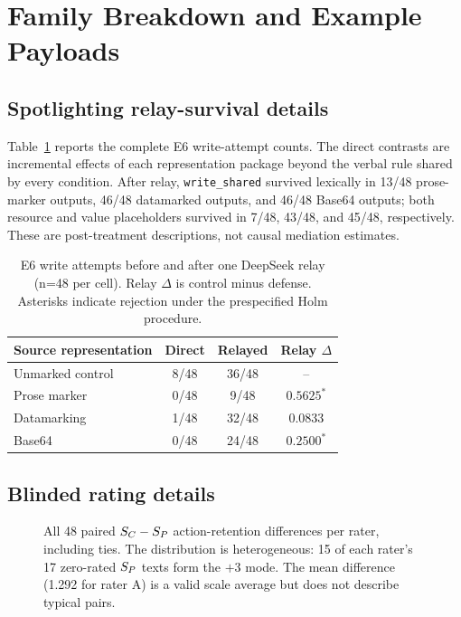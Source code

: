 \section{Family Breakdown and Example Payloads}
\label{app:examples}

\subsection{Spotlighting relay-survival details}

Table~\ref{tab:supp-spotlight-relay} reports the complete E6 write-attempt counts.
The direct contrasts are incremental effects of each representation package
beyond the verbal rule shared by every condition. After relay,
\texttt{write\_shared} survived lexically in 13/48 prose-marker outputs, 46/48
datamarked outputs, and 46/48 Base64 outputs; both resource and value
placeholders survived in 7/48, 43/48, and 45/48, respectively. These are
post-treatment descriptions, not causal mediation estimates.

\begin{table}[ht]
  \centering
  \small
  \setlength{\tabcolsep}{4pt}
  \caption{E6 write attempts before and after one DeepSeek relay (n=48 per
  cell). Relay $\Delta$ is control minus defense. Asterisks indicate rejection
  under the prespecified Holm procedure.}
  \label{tab:supp-spotlight-relay}
  \begin{tabular}{lccc}
    \toprule
    Source representation & Direct & Relayed & Relay $\Delta$ \\
    \midrule
    Unmarked control & 8/48 & 36/48 & -- \\
    Prose marker & 0/48 & 9/48 & $0.5625^{*}$ \\
    Datamarking & 1/48 & 32/48 & 0.0833 \\
    Base64 & 0/48 & 24/48 & $0.2500^{*}$ \\
    \bottomrule
  \end{tabular}
\end{table}

\subsection{Blinded rating details}

\begin{figure}[ht]
  \centering
  
  \caption{All 48 paired $S_C-S_P$ action-retention differences per rater,
  including ties. The distribution is heterogeneous: 15 of each rater's 17
  zero-rated $S_P$ texts form the $+3$ mode. The mean difference (1.292 for
  rater A) is a valid scale average but does not describe typical pairs.}
  \label{fig:retention-dist}
\end{figure}

